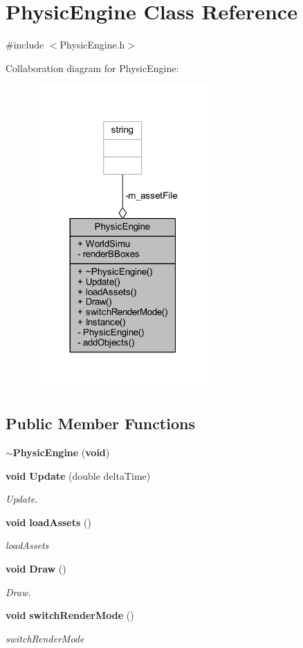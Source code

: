 \section{Physic\+Engine Class Reference}
\label{class_physic_engine}


{\ttfamily \#include $<$Physic\+Engine.\+h$>$}



Collaboration diagram for Physic\+Engine\+:\nopagebreak
\begin{figure}[H]
\begin{center}
\leavevmode
\includegraphics[width=197pt]{d7/d36/class_physic_engine__coll__graph}
\end{center}
\end{figure}
\subsection*{Public Member Functions}
\begin{DoxyCompactItemize}
\item 
{\bf $\sim$\+Physic\+Engine} ({\bf void})
\item 
{\bf void} {\bf Update} (double delta\+Time)
\begin{DoxyCompactList}\small\item\em Update. \end{DoxyCompactList}\item 
{\bf void} {\bf load\+Assets} ()
\begin{DoxyCompactList}\small\item\em load\+Assets \end{DoxyCompactList}\item 
{\bf void} {\bf Draw} ()
\begin{DoxyCompactList}\small\item\em Draw. \end{DoxyCompactList}\item 
{\bf void} {\bf switch\+Render\+Mode} ()
\begin{DoxyCompactList}\small\item\em switch\+Render\+Mode \end{DoxyCompactList}\end{DoxyCompactItemize}
